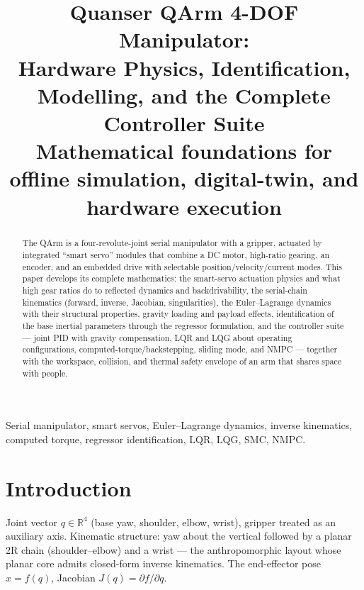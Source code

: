 \documentclass[conference]{IEEEtran}
\begin{document}
\title{Quanser QArm 4-DOF Manipulator:\\ Hardware Physics, Identification, Modelling, and the Complete Controller Suite\\
{\footnotesize Mathematical foundations for offline simulation, digital-twin, and hardware execution}}

\author{
}

\maketitle

\begin{abstract}
The QArm is a four-revolute-joint serial manipulator with a gripper, actuated by integrated ``smart servo'' modules that combine a DC motor, high-ratio gearing, an encoder, and an embedded drive with selectable position/velocity/current modes. This paper develops its complete mathematics: the smart-servo actuation physics and what high gear ratios do to reflected dynamics and backdrivability, the serial-chain kinematics (forward, inverse, Jacobian, singularities), the Euler--Lagrange dynamics with their structural properties, gravity loading and payload effects, identification of the base inertial parameters through the regressor formulation, and the controller suite --- joint PID with gravity compensation, LQR and LQG about operating configurations, computed-torque/backstepping, sliding mode, and NMPC --- together with the workspace, collision, and thermal safety envelope of an arm that shares space with people.
\end{abstract}

\begin{IEEEkeywords}
Serial manipulator, smart servos, Euler--Lagrange dynamics, inverse kinematics, computed torque, regressor identification, LQR, LQG, SMC, NMPC.
\end{IEEEkeywords}

\section{Introduction}
Joint vector $q\in\mathbb R^4$ (base yaw, shoulder, elbow, wrist), gripper treated as an auxiliary axis. Kinematic structure: yaw about the vertical followed by a planar 2R chain (shoulder--elbow) and a wrist --- the anthropomorphic layout whose planar core admits closed-form inverse kinematics. The end-effector pose $x = f(q)$, Jacobian $J(q) = \partial f/\partial q$.
\end{document}
